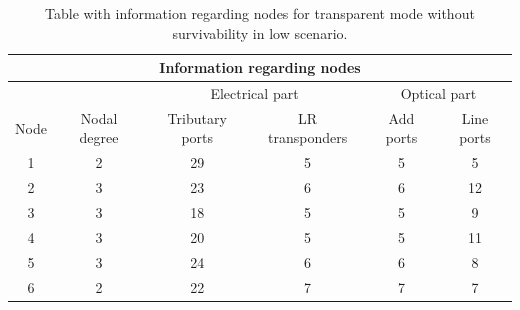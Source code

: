 \begin{table}[H]
	\centering
	\begin{tabular}{|c|c|c|c|c|c|}
		\hline
		\multicolumn{6}{|c|}{\textbf{Information regarding nodes}} \\ \hline
		\multicolumn{2}{|c|}{} & \multicolumn{2}{c|}{Electrical part} & \multicolumn{2}{c|}{Optical part} \\ \hline
		Node & Nodal degree & Tributary ports & LR transponders & Add ports & Line ports \\ \hline
		1 & 2 & 29 & 5 & 5 & 5 \\ \hline
		2 & 3 & 23 & 6 & 6 & 12 \\ \hline
		3 & 3 & 18 & 5 & 5 & 9 \\ \hline
		4 & 3 & 20 & 5 & 5 & 11 \\ \hline
		5 & 3 & 24 & 6 & 6 & 8 \\ \hline
		6 & 2 & 22 & 7 & 7 & 7 \\ \hline
	\end{tabular}
	\caption{Table with information regarding nodes for transparent mode without survivability in low
	scenario.}
\end{table}
